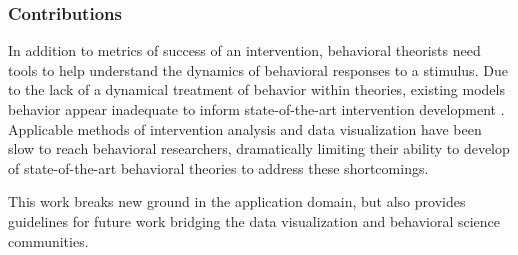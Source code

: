 {\subsubsection{Contributions}
In addition to metrics of success of an intervention, behavioral theorists need tools to help understand the dynamics of behavioral responses to a stimulus.
Due to the lack of a dynamical treatment of behavior within theories, existing models behavior appear inadequate to inform state-of-the-art intervention development \cite{riley2011}.
Applicable methods of intervention analysis and data visualization have been slow to reach behavioral researchers, dramatically limiting their ability to develop of state-of-the-art behavioral theories to address these shortcomings.

}


This work breaks new ground in the application domain, but also provides guidelines for future work bridging the data visualization and behavioral science communities.
